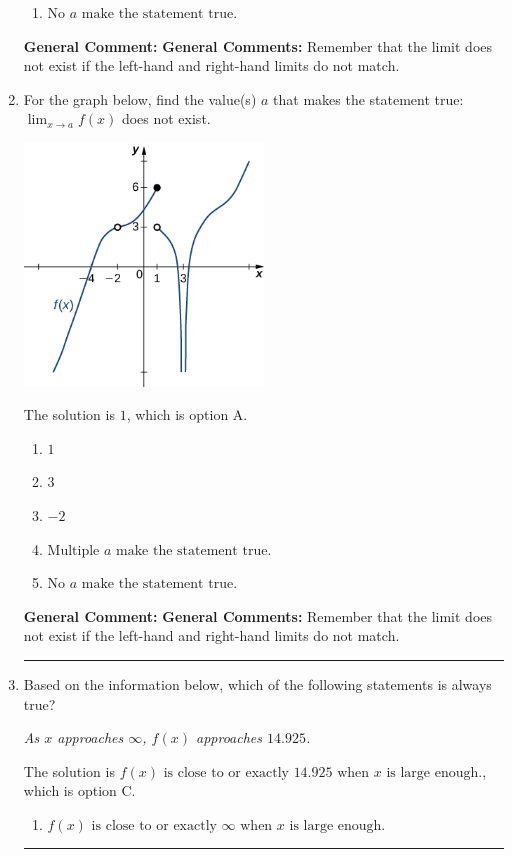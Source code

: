 \documentclass{extbook}[14pt]
\newcommand{\litem}[1]{\item #1

\rule{\textwidth}{0.4pt}}
\begin{document}
\begin{enumerate}
{\begin{enumerate}[label=\Alph*.]
\item \( \text{No } a \text{ make the statement true}. \)


\end{enumerate}

\textbf{General Comment:} \textbf{General Comments:} Remember that the limit does not exist if the left-hand and right-hand limits do not match.
}
\litem{
For the graph below, find the value(s) $a$ that makes the statement true: $ \displaystyle \lim_{x \rightarrow a} f(x)$ does not exist.

\begin{center}
    \includegraphics[width=0.5\textwidth]{../Figures/evaluateLimitGraphicallyCopyC.png}
\end{center}


The solution is \( 1 \), which is option A.\begin{enumerate}[label=\Alph*.]
\item \( 1 \)


\item \( 3 \)


\item \( -2 \)


\item \( \text{Multiple } a \text{ make the statement true}. \)


\item \( \text{No } a \text{ make the statement true}. \)


\end{enumerate}

\textbf{General Comment:} \textbf{General Comments:} Remember that the limit does not exist if the left-hand and right-hand limits do not match.
}
\litem{
Based on the information below, which of the following statements is always true?

\begin{center}
    \textit{ As $x$ approaches $\infty$, $f(x)$ approaches $14.925$. }
\end{center}
The solution is \( f(x) \text{ is close to or exactly } 14.925 \text{ when } x \text{ is large enough}. \), which is option C.\begin{enumerate}[label=\Alph*.]
\item \( f(x) \text{ is close to or exactly } \infty \text{ when } x \text{ is large enough}. \)



\end{enumerate}}
\end{enumerate}
\end{document}
